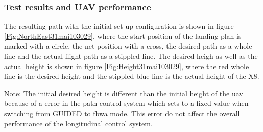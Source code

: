 \subsubsection{Test results and UAV performance}
The resulting path with the initial set-up configuration is shown in figure \ref{Fig:NorthEast31mai103029}, where the start position of the landing plan is marked with a circle, the net position with a cross, the desired path as a whole line and the actual flight path as a stippled line. The desired heigh as well as the actual height is shown in figure \ref{Fig:Height31mai103029}, where the red whole line is the desired height and the stippled blue line is the actual height of the X8.

Note: The initial desired height is different than the initial height of the \gls{uav} because of a error in the path control system which sets to a fixed  value when switching from GUIDED to \gls{fbwa} mode. This error do not affect the overall performance of the longitudinal control system.


